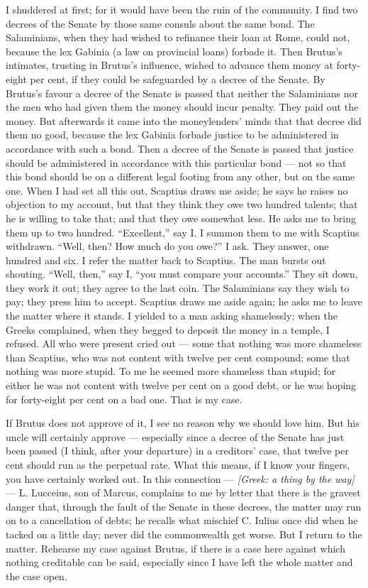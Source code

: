  I shuddered at first; for it would have been the ruin of the community. I find two decrees of the Senate by those same consuls about the same bond. The Salaminians, when they had wished to refinance their loan at Rome, could not, because the lex Gabinia (a law on provincial loans) forbade it. Then Brutus's intimates, trusting in Brutus's influence, wished to advance them money at forty-eight per cent, if they could be safeguarded by a decree of the Senate. By Brutus's favour a decree of the Senate is passed that neither the Salaminians nor the men who had given them the money should incur penalty. They paid out the money. But afterwards it came into the moneylenders' minds that that decree did them no good, because the lex Gabinia forbade justice to be administered in accordance with such a bond. Then a decree of the Senate is passed that justice should be administered in accordance with this particular bond --- not so that this bond should be on a different legal footing from any other, but on the same one. When I had set all this out, Scaptius draws me aside; he says he raises no objection to my account, but that they think they owe two hundred talents; that he is willing to take that; and that they owe somewhat less. He asks me to bring them up to two hundred. ``Excellent,'' say I. I summon them to me with Scaptius withdrawn. ``Well, then? How much do you owe?'' I ask. They answer, one hundred and six. I refer the matter back to Scaptius. The man bursts out shouting. ``Well, then,'' say I, ``you must compare your accounts.'' They sit down, they work it out; they agree to the last coin. The Salaminians say they wish to pay; they press him to accept. Scaptius draws me aside again; he asks me to leave the matter where it stands. I yielded to a man asking shamelessly; when the Greeks complained, when they begged to deposit the money in a temple, I refused. All who were present cried out --- some that nothing was more shameless than Scaptius, who was not content with twelve per cent compound; some that nothing was more stupid. To me he seemed more shameless than stupid; for either he was not content with twelve per cent on a good debt, or he was hoping for forty-eight per cent on a bad one. That is my case.

 If Brutus does not approve of it, I see no reason why we should love him. But his uncle will certainly approve --- especially since a decree of the Senate has just been passed (I think, after your departure) in a creditors' case, that twelve per cent should run as the perpetual rate. What this means, if I know your fingers, you have certainly worked out. In this connection --- \textit{[Greek: a thing by the way]} --- L. Lucceius, son of Marcus, complains to me by letter that there is the gravest danger that, through the fault of the Senate in these decrees, the matter may run on to a cancellation of debts; he recalls what mischief C. Iulius once did when he tacked on a little day; never did the commonwealth get worse. But I return to the matter. Rehearse my case against Brutus, if there is a case here against which nothing creditable can be said, especially since I have left the whole matter and the case open.

